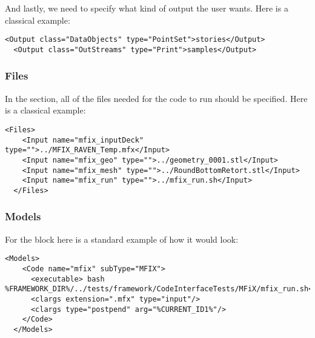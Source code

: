 And lastly, we need to specify what kind of output the user wants.
Here is a classical example:
\begin{lstlisting}[style=XML,morekeywords={class,type}]
  <Output class="DataObjects" type="PointSet">stories</Output>
  <Output class="OutStreams" type="Print">samples</Output>
\end{lstlisting}

\subsubsection{Files}
In the  section, all of the files needed for the code to run should be specified.
Here is a classical example:

\begin{lstlisting}[style=XML]
  <Files>
    <Input name="mfix_inputDeck" type="">../MFIX_RAVEN_Temp.mfx</Input>
    <Input name="mfix_geo" type="">../geometry_0001.stl</Input>
    <Input name="mfix_mesh" type="">../RoundBottomRetort.stl</Input>
    <Input name="mfix_run" type="">../mfix_run.sh</Input>
  </Files>
\end{lstlisting}

\subsubsection{Models}
\label{subsubsection:Relap5Models}
For the  block here is a standard example of how it would look:

\begin{lstlisting}[style=XML]
  <Models>
    <Code name="mfix" subType="MFIX">
      <executable> bash %FRAMEWORK_DIR%/../tests/framework/CodeInterfaceTests/MFiX/mfix_run.sh</executable>
      <clargs extension=".mfx" type="input"/>
      <clargs type="postpend" arg="%CURRENT_ID1%"/>
    </Code>
  </Models>
\end{lstlisting}